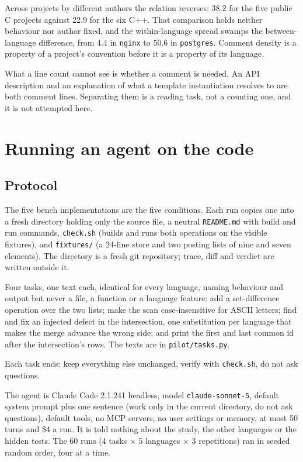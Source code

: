 \documentclass[11pt,a4paper]{article}
\begin{document}
Across projects by different authors the relation reverses: 38.2 for the five public C projects against 22.9 for the six C++. That comparison holds neither behaviour nor author fixed, and the within-language spread swamps the between-language difference, from 4.4 in \texttt{nginx} to 50.6 in \texttt{postgres}. Comment density is a property of a project's convention before it is a property of its language.

What a line count cannot see is whether a comment is needed. An API description and an explanation of what a template instantiation resolves to are both comment lines. Separating them is a reading task, not a counting one, and it is not attempted here.

\section{Running an agent on the code}
\label{sec:pilot}

\subsection{Protocol}

The five bench implementations are the five conditions. Each run copies one into a fresh directory holding only the source file, a neutral \texttt{README.md} with build and run commands, \texttt{check.sh} (builds and runs both operations on the visible fixtures), and \texttt{fixtures/} (a 24-line store and two posting lists of nine and seven elements). The directory is a fresh git repository; trace, diff and verdict are written outside it.

Four tasks, one text each, identical for every language, naming behaviour and output but never a file, a function or a language feature: add a set-difference operation over the two lists; make the scan case-insensitive for ASCII letters; find and fix an injected defect in the intersection, one substitution per language that makes the merge advance the wrong side; and print the first and last common id after the intersection's rows. The texts are in \texttt{pilot/tasks.py}.

Each task ends: keep everything else unchanged, verify with \texttt{check.sh}, do not ask questions.

The agent is Claude Code 2.1.241 headless, model \texttt{claude-sonnet-5}, default system prompt plus one sentence (work only in the current directory, do not ask questions), default tools, no MCP servers, no user settings or memory, at most 50 turns and \$4 a run. It is told nothing about the study, the other languages or the hidden tests. The 60 runs (4 tasks $\times$ 5 languages $\times$ 3 repetitions) ran in seeded random order, four at a time.
\end{document}
